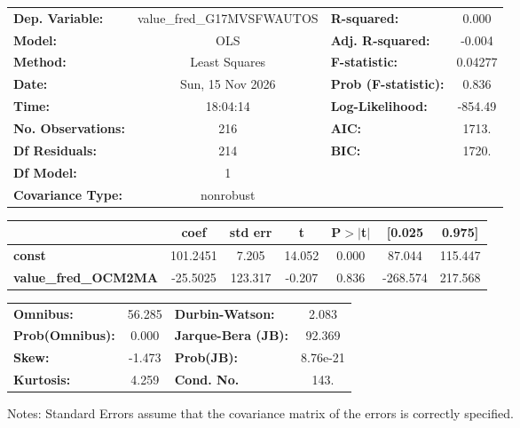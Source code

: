\begin{center}
\begin{tabular}{lclc}
\toprule
\textbf{Dep. Variable:}      & value\_fred\_G17MVSFWAUTOS & \textbf{  R-squared:         } &     0.000   \\
\textbf{Model:}              &            OLS             & \textbf{  Adj. R-squared:    } &    -0.004   \\
\textbf{Method:}             &       Least Squares        & \textbf{  F-statistic:       } &   0.04277   \\
\textbf{Date:}               &      Sun, 15 Nov 2026      & \textbf{  Prob (F-statistic):} &    0.836    \\
\textbf{Time:}               &          18:04:14          & \textbf{  Log-Likelihood:    } &   -854.49   \\
\textbf{No. Observations:}   &              216           & \textbf{  AIC:               } &     1713.   \\
\textbf{Df Residuals:}       &              214           & \textbf{  BIC:               } &     1720.   \\
\textbf{Df Model:}           &                1           & \textbf{                     } &             \\
\textbf{Covariance Type:}    &         nonrobust          & \textbf{                     } &             \\
\bottomrule
\end{tabular}
\begin{tabular}{lcccccc}
                             & \textbf{coef} & \textbf{std err} & \textbf{t} & \textbf{P$> |$t$|$} & \textbf{[0.025} & \textbf{0.975]}  \\
\midrule
\textbf{const}               &     101.2451  &        7.205     &    14.052  &         0.000        &       87.044    &      115.447     \\
\textbf{value\_fred\_OCM2MA} &     -25.5025  &      123.317     &    -0.207  &         0.836        &     -268.574    &      217.568     \\
\bottomrule
\end{tabular}
\begin{tabular}{lclc}
\textbf{Omnibus:}       & 56.285 & \textbf{  Durbin-Watson:     } &    2.083  \\
\textbf{Prob(Omnibus):} &  0.000 & \textbf{  Jarque-Bera (JB):  } &   92.369  \\
\textbf{Skew:}          & -1.473 & \textbf{  Prob(JB):          } & 8.76e-21  \\
\textbf{Kurtosis:}      &  4.259 & \textbf{  Cond. No.          } &     143.  \\
\bottomrule
\end{tabular}
\end{center}

Notes: \newline
 [1] Standard Errors assume that the covariance matrix of the errors is correctly specified.